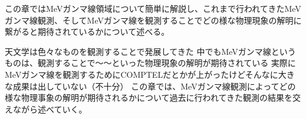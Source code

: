 この章ではMeVガンマ線領域について簡単に解説し、これまで行われてきたMeVガンマ線観測、そしてMeVガンマ線を観測することでどの様な物理現象の解明に繋がると期待されているかについて述べる。



%
天文学は色々なものを観測することで発展してきた
中でもMeVガンマ線というものは、観測することで〜〜といった物理現象の解明が期待されている
実際にMeVガンマ線を観測するためにCOMPTELだとかが上がったけどそんなに大きな成果は出していない（不十分）
この章では、MeVガンマ線観測によってどの様な物理事象の解明が期待されるかについて過去に行われてきた観測の結果を交えながら述べていく。




